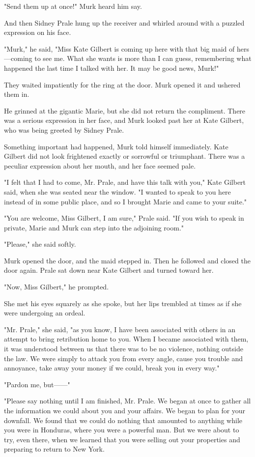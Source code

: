 \documentclass{novel}
\begin{document}
"Send them up at once!" Murk heard him say.

And then Sidney Prale hung up the receiver and whirled around with a puzzled expression on his face.

"Murk," he said, "Miss Kate Gilbert is coming up here with that big maid of hers---coming to see me. What she wants is more than I can guess, remembering what happened the last time I talked with her. It may be good news, Murk!"

They waited impatiently for the ring at the door. Murk opened it and ushered them in.

He grinned at the gigantic Marie, but she did not return the compliment. There was a serious expression in her face, and Murk looked past her at Kate Gilbert, who was being greeted by Sidney Prale.

Something important had happened, Murk told himself immediately. Kate Gilbert did not look frightened exactly or sorrowful or triumphant. There was a peculiar expression about her mouth, and her face seemed pale.

"I felt that I had to come, Mr. Prale, and have this talk with you," Kate Gilbert said, when she was seated near the window. "I wanted to speak to you here instead of in some public place, and so I brought Marie and came to your suite."

"You are welcome, Miss Gilbert, I am sure," Prale said. "If you wish to speak in private, Marie and Murk can step into the adjoining room."

"Please," she said softly.

Murk opened the door, and the maid stepped in. Then he followed and closed the door again. Prale sat down near Kate Gilbert and turned toward her.

"Now, Miss Gilbert," he prompted.

She met his eyes squarely as she spoke, but her lips trembled at times as if she were undergoing an ordeal.

"Mr. Prale," she said, "as you know, I have been associated with others in an attempt to bring retribution home to you. When I became associated with them, it was understood between us that there was to be no violence, nothing outside the law. We were simply to attack you from every angle, cause you trouble and annoyance, take away your money if we could, break you in every way."

"Pardon me, but------"

"Please say nothing until I am finished, Mr. Prale. We began at once to gather all the information we could about you and your affairs. We began to plan for your downfall. We found that we could do nothing that amounted to anything while you were in Honduras, where you were a powerful man. But we were about to try, even there, when we learned that you were selling out your properties and preparing to return to New York.
\end{document}
